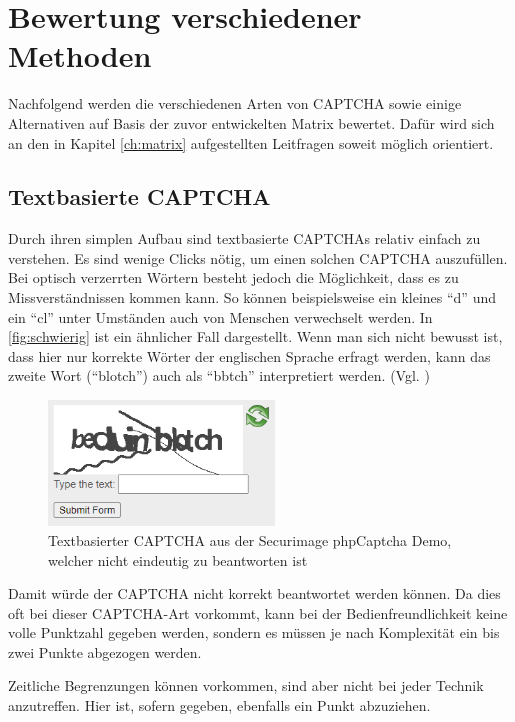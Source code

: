 \chapter{Bewertung verschiedener Methoden}
\label{ch:bewertung}

Nachfolgend werden die verschiedenen Arten von CAPTCHA sowie einige Alternativen auf Basis der zuvor entwickelten Matrix bewertet. 
Dafür wird sich an den in Kapitel \ref{ch:matrix} aufgestellten Leitfragen soweit möglich orientiert.

\section{Textbasierte CAPTCHA}
\label{ch:bewertung:text}
Durch ihren simplen Aufbau sind textbasierte CAPTCHAs relativ einfach zu verstehen.
Es sind wenige Clicks nötig, um einen solchen CAPTCHA auszufüllen. 
Bei optisch verzerrten Wörtern besteht jedoch die Möglichkeit, dass es zu Missverständnissen kommen kann.
So können beispielsweise ein kleines ``d'' und ein ``cl'' unter Umständen auch von Menschen verwechselt werden. 
In \autoref{fig:schwierig} ist ein ähnlicher Fall dargestellt. 
Wenn man sich nicht bewusst ist, dass hier nur korrekte Wörter der englischen Sprache erfragt werden,
kann das zweite Wort (``blotch'') auch als ``bbtch'' interpretiert werden. (Vgl. \cite[p.132]{Beheshti})

\begin{figure}[h!]
    \centering
    \includegraphics[width=6cm]{gfx/mygraphics/schwierig4.png}
    \caption{Textbasierter CAPTCHA aus der Securimage phpCaptcha Demo, welcher nicht eindeutig zu beantworten ist}
    \label{fig:schwierig}
\end{figure}

Damit würde der CAPTCHA nicht korrekt beantwortet werden können.
Da dies oft bei dieser CAPTCHA-Art vorkommt, kann bei der Bedienfreundlichkeit keine volle Punktzahl gegeben werden,
sondern es müssen je nach Komplexität ein bis zwei Punkte abgezogen werden.

Zeitliche Begrenzungen können vorkommen, sind aber nicht bei jeder Technik anzutreffen.
Hier ist, sofern gegeben, ebenfalls ein Punkt abzuziehen.

